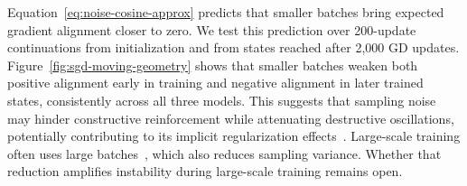 Equation~\eqref{eq:noise-cosine-approx} predicts that smaller batches bring expected gradient alignment closer to zero. We test this prediction over 200-update continuations from initialization and from states reached after 2,000 GD updates. Figure~\ref{fig:sgd-moving-geometry} shows that smaller batches weaken both positive alignment early in training and negative alignment in later trained states, consistently across all three models. This suggests that sampling noise may hinder constructive reinforcement while attenuating destructive oscillations, potentially contributing to its implicit regularization effects~\cite{haochen2021shape,smith2021origin}. Large-scale training often uses large batches~\cite{mccandlish2018largebatch,chowdhery2022palm}, which also reduces sampling variance. Whether that reduction amplifies instability during large-scale training remains open.

